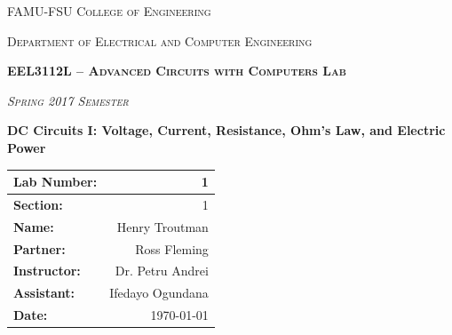 \documentclass{article}
\begin{document}

      \begin{titlepage}
    \centering
    	{\scshape\LARGE FAMU-FSU College of Engineering \par}
    	\vspace{0.75cm}
    	{\scshape\large Department of Electrical and Computer Engineering\par}
    	\vspace{0.25cm}
      {\scshape\large\bfseries EEL3112L – Advanced Circuits with Computers Lab  \par}
      \vspace{0.25cm}
    	{\scshape\large \textit{ Spring 2017 Semester} \par}
    	\vspace{1.2cm}
      {\Large\bfseries DC Circuits I: Voltage, Current, Resistance, Ohm’s Law, and Electric Power \par}
      \vspace{1cm}
      \vfill
      \def\arraystretch{2.5}
      \begin{tabular}{  l  r  }
        \hline

          {\large\textbf{Lab Number:} }  & { \large 1 } \\ \hline
          {\large\textbf{Section:} }  & { \large 1 } \\ \hline
          {\large\textbf{Name:} }  & { \large Henry Troutman } \\ \hline
          {\large\textbf{Partner:} }  & { \large Ross Fleming } \\ \hline
          {\large\textbf{Instructor:} }  & { \large Dr. Petru Andrei } \\ \hline
          {\large\textbf{Assistant:} }  & { \large Ifedayo Ogundana } \\ \hline
          {\large\textbf{Date:} }  & { \large \today } \\ \hline

        \end{tabular}
        \vspace{3cm}

  \end{titlepage}


        \clearpage
    \newpage
    \tableofcontents
    \listoftables
    \newpage
    
\end{document}
